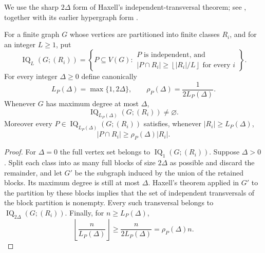 We use the sharp $2\Delta$ form of Haxell's independent-transversal theorem; see \cite[Theorem~2]{Haxell2001}, together with its earlier hypergraph form \cite{Haxell1995}.

\begin{proposition}\label{prop:haxell-quota}
For a finite graph $G$ whose vertices are partitioned into finite classes $R_i$, and for an integer $L\ge1$, put
\[
\operatorname{IQ}_L(G;(R_i))=
\left\{
P\subseteq V(G):
\begin{array}{l}
P\text{ is independent, and}\\[-1mm]
|P\cap R_i|\ge\left\lfloor |R_i|/L\right\rfloor\text{ for every }i
\end{array}
\right\}.
\]
For every integer $\Delta\ge0$ define canonically
\begin{equation}\label{eq:haxell-canonical-parameters}
L_P(\Delta)=\max\{1,2\Delta\},
\qquad
\rho_P(\Delta)=\frac1{2L_P(\Delta)}.
\end{equation}
Whenever $G$ has maximum degree at most $\Delta$,
\begin{equation}\label{eq:independent-quota-nonempty}
\operatorname{IQ}_{L_P(\Delta)}(G;(R_i))\ne\varnothing.
\end{equation}
Moreover every $P\in\operatorname{IQ}_{L_P(\Delta)}(G;(R_i))$ satisfies, whenever $|R_i|\ge L_P(\Delta)$,
\[
|P\cap R_i|\ge \rho_P(\Delta)|R_i|.
\]
\end{proposition}

\begin{proof}
For $\Delta=0$ the full vertex set belongs to $\operatorname{IQ}_1(G;(R_i))$.  Suppose $\Delta>0$.  Split each class into as many full blocks of size $2\Delta$ as possible and discard the remainder, and let $G'$ be the subgraph induced by the union of the retained blocks.  Its maximum degree is still at most $\Delta$.  Haxell's theorem applied in $G'$ to the partition by these blocks implies that the set of independent transversals of the block partition is nonempty.  Every such transversal belongs to $\operatorname{IQ}_{2\Delta}(G;(R_i))$.  Finally, for $n\ge L_P(\Delta)$,
\[
\left\lfloor\frac n{L_P(\Delta)}\right\rfloor
\ge\frac{n}{2L_P(\Delta)}
=\rho_P(\Delta)n.
\]
\end{proof}
